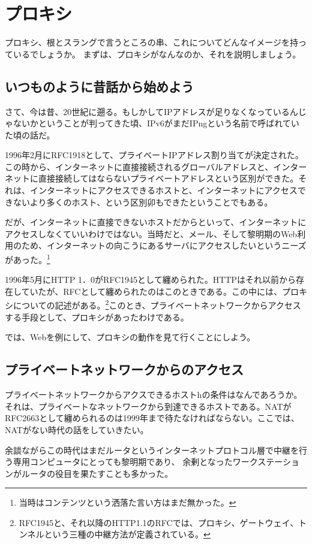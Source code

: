 \chapter{プロキシ}
プロキシ、根とスラングで言うところの串、これについてどんなイメージを持っているでしょうか。
まずは、プロキシがなんなのか、それを説明しましょう。

\section{いつものように昔話から始めよう}
さて、今は昔、20世紀に遡る。もしかしてIPアドレスが足りなくなっているんじゃないかということが判ってきた頃、IPv6がまだIPngという名前で呼ばれていた頃の話だ。

1996年2月にRFC1918として、プライベートIPアドレス割り当てが決定された。この時から、インターネットに直接接続されるグローバルアドレスと、インターネットに直接接続してはならないプライベートアドレスという区別ができた。それは、インターネットにアクセスできるホストと、インターネットにアクセスできないより多くのホスト、という区別卯もできたということでもある。

だが、インターネットに直接できないホストだからといって、インターネットにアクセスしなくていいわけではない。当時だと、メール、そして黎明期のWeb利用のため、インターネットの向こうにあるサーバにアクセスしたいというニーズがあった。\footnote{当時はコンテンツという洒落た言い方はまだ無かった。}

1996年5月にHTTP 1．0がRFC1945として纏められた。HTTPはそれ以前から存在していたが、RFCとして纏められたのはこのときである。この中には、プロキシについての記述がある。\footnote{RFC1945と、それ以降のHTTP1.1のRFCでは、プロキシ、ゲートウェイ、トンネルという三種の中継方法が定義されている。}このとき、プライベートネットワークからアクセスする手段として、プロキシがあったわけである。

では、Webを例にして、プロキシの動作を見て行くことにしよう。

\section{プライベートネットワークからのアクセス}
プライベートネットワークからアクスできるホストhの条件はなんであろうか。それは、プライベートなネットワークから到達できるホストである。NATがRFC2663として纏められるのは1999年まで待たなければならない。ここでは、NATがない時代の話をしていきたい。

余談ながらこの時代はまだルータというインターネットプロトコル層で中継を行う専用コンピュータにとっても黎明期であり、
余剰となったワークステーションがルータの役目を果たすことも多かった。

